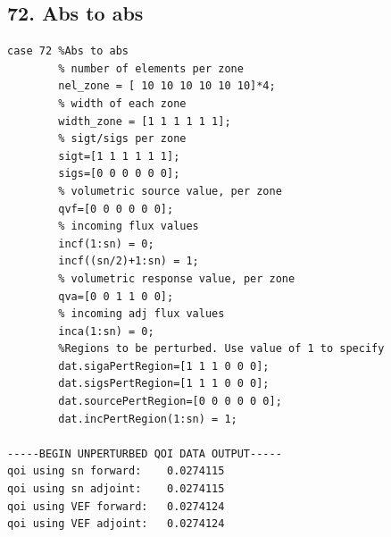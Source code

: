 \documentclass{article}
\begin{document}
\subsection{72. Abs to abs}
\begin{verbatim}
case 72 %Abs to abs
        % number of elements per zone
        nel_zone = [ 10 10 10 10 10 10]*4;
        % width of each zone
        width_zone = [1 1 1 1 1 1];
        % sigt/sigs per zone
        sigt=[1 1 1 1 1 1];
        sigs=[0 0 0 0 0 0];
        % volumetric source value, per zone
        qvf=[0 0 0 0 0 0];
        % incoming flux values
        incf(1:sn) = 0;
        incf((sn/2)+1:sn) = 1;
        % volumetric response value, per zone
        qva=[0 0 1 1 0 0];
        % incoming adj flux values
        inca(1:sn) = 0;
        %Regions to be perturbed. Use value of 1 to specify
        dat.sigaPertRegion=[1 1 1 0 0 0];
        dat.sigsPertRegion=[1 1 1 0 0 0];
        dat.sourcePertRegion=[0 0 0 0 0 0];
        dat.incPertRegion(1:sn) = 1; 
        
-----BEGIN UNPERTURBED QOI DATA OUTPUT----- 
qoi using sn forward: 	 0.0274115 
qoi using sn adjoint: 	 0.0274115 
qoi using VEF forward: 	 0.0274124 
qoi using VEF adjoint: 	 0.0274124 
\end{verbatim}
\end{document}
